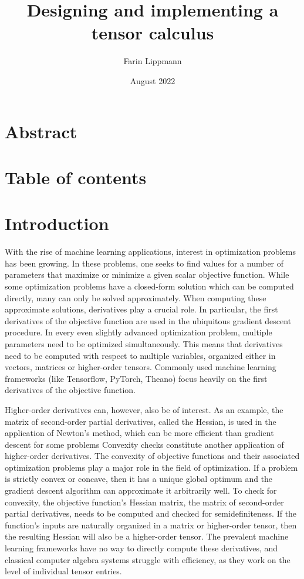 \documentclass[12pt, a4paper]{report}
\title{Designing and implementing a tensor calculus}
\author{Farin Lippmann}
\date{August 2022}
\begin{document}
\maketitle

\chapter{Abstract}

\chapter{Table of contents}
\setcounter{page}{3}

\chapter{Introduction}

With the rise of machine learning applications, interest in optimization problems has been growing.  %
In these problems, one seeks to find values for a number of parameters that maximize or minimize a given scalar objective function.
While some optimization problems have a closed-form solution which can be computed directly, many can only be solved approximately.
When computing these approximate solutions, derivatives play a crucial role.
In particular, the first derivatives of the objective function are used in the ubiquitous gradient descent procedure.
In every even slightly advanced optimization problem, multiple parameters need to be optimized simultaneously.
This means that derivatives need to be computed with respect to multiple variables, organized either in vectors, matrices or higher-order tensors.
Commonly used machine learning frameworks (like Tensorflow, PyTorch, Theano) focus heavily on the first derivatives of the objective function.

Higher-order derivatives can, however, also be of interest.
As an example, the matrix of second-order partial derivatives, called the Hessian, is used in the application of Newton's method, which can be more efficient than gradient descent for some problems
Convexity checks constitute another application of higher-order derivatives.
The convexity of objective functions and their associated optimization problems play a major role in the field of optimization.
If a problem is strictly convex or concave, then it has a unique global optimum and the gradient descent algorithm can approximate it arbitrarily well.
To check for convexity, the objective function's Hessian matrix, the matrix of second-order partial derivatives, needs to be computed and checked for semidefiniteness.
If the function's inputs are naturally organized in a matrix or higher-order tensor, then the resulting Hessian will also be a higher-order tensor.
The prevalent machine learning frameworks have no way to directly compute these derivatives, and classical computer algebra systems struggle with efficiency, as they work on the level of individual tensor entries.
\end{document}

